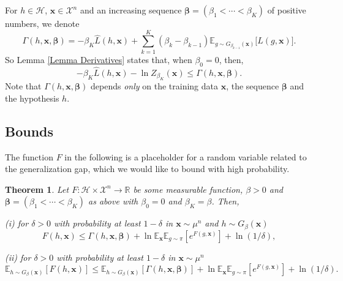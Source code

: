 \documentclass{article} %
\newtheorem{theorem}{Theorem}[section]
\begin{document}
For $h\in \mathcal{H}$, $\mathbf{x\in }\mathcal{X}^{n}$ and an increasing sequence $\bm{\beta}=\left( \beta _{1}<\cdots<\beta _{K}\right) 
$ of positive numbers, we denote \begin{equation}
\Gamma(h,\mathbf{x},\bm{\beta})=-\beta_{K}\hat{L}(h,\mathbf{x})+\sum_{k=1}^{K}(\beta_{k}-\beta_{k-1})\mathbb{E}_{g\sim G_{\beta_{k-1}}(\mathbf{x})}\big[\hat{L}(g,\mathbf{x})\big].
\label{eq:gamma}
\end{equation}%
So Lemma \ref{Lemma Derivatives} states that, when $\beta_{0}=0$, then,  
\begin{equation}
-\beta _{K}\hat{L}\left( h,\mathbf{x}\right) -\ln Z_{\beta _{K}}\left( 
\mathbf{x}\right) \leq \Gamma \left( h,\mathbf{x},\bm{\beta}\right) .
\label{density bound}
\end{equation}%
Note that $\Gamma \left( h,\mathbf{x},\bm{\beta}\right) $ depends 
\textit{only} on the training data $\mathbf{x}$, the sequence $\bm{\beta 
}$ and the hypothesis $h$.

\subsection{Bounds\label{Section bounds}}
The function $F$ in the following is a placeholder for a random variable related to the generalization gap, which we would like to bound with high probability.
\begin{theorem}
\label{Theorem Main}Let $F:\mathcal{H}\times \mathcal{X}^{n}\rightarrow 
\mathbb{R}$ be some measurable function, $\beta >0$ and $\bm{\beta}=\left( \beta _{1}<\cdots<\beta _{K}\right) $ as above with $\beta_{0}=0$ and $\beta _{K}=\beta $. Then,

(i) for $\delta >0$ with probability at least $1-\delta $ in $\mathbf{x}\sim
\mu ^{n}$ and $h\sim G_{\beta }\left( \mathbf{x}\right) $ 
\begin{equation*}
F\left( h,\mathbf{x}\right) \leq \Gamma \left( h,\mathbf{x},\bm{\beta}%
\right) +\ln \mathbb{E}_{\mathbf{x}}\mathbb{E}_{g\sim \pi }\left[ e^{F\left(
g,\mathbf{x}\right) }\right] +\ln \left( 1/\delta \right),
\end{equation*}

(ii) for $\delta >0$ with probability at least $1-\delta $ in $\mathbf{x}%
\sim \mu ^{n}$ 
\begin{equation*}
\mathbb{E}_{h\sim G_{\beta }\left( \mathbf{x}\right) }\left[ F\left( h,%
\mathbf{x}\right) \right] \leq \mathbb{E}_{h\sim G_{\beta }\left( \mathbf{x}%
\right) }\left[ \Gamma \left( h,\mathbf{x},\bm{\beta}\right) \right]
+\ln \mathbb{E}_{\mathbf{x}}\mathbb{E}_{g\sim \pi }\left[ e^{F\left( g,%
\mathbf{x}\right) }\right] +\ln \left( 1/\delta \right).
\end{equation*}
\end{theorem}
\end{document}

